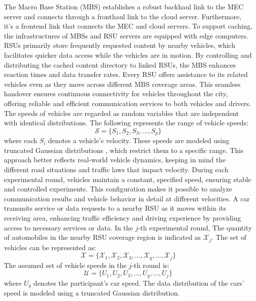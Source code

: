 \documentclass[journal]{IEEEtran}
\begin{document}
The Macro Base Station (MBS) establishes a robust backhaul link to the MEC server and connects through a fronthaul link to the cloud server. Furthermore, it's a frontend link that connects the MEC and cloud servers. To support caching, the infrastructures of MBSs and RSU servers are equipped with edge computers. RSUs primarily store frequently requested content by nearby vehicles, which facilitates quicker data access while the vehicles are in motion. By controlling and distributing the cached content directory to linked RSUs, the MBS enhances reaction times and data transfer rates. Every RSU offers assistance to its related vehicles even as they move across different MBS coverage areas. This seamless handover ensures continuous connectivity for vehicles throughout the city, offering reliable and efficient communication services to both vehicles and drivers. The speeds of vehicles are regarded as random variables that are independent with identical distributions. The following represents the range of vehicle speeds:
\begin{equation}
\mathcal{S} = \{ S_1, S_2, S_3, \ldots, S_p \}
\end{equation}
where each \( S_i \) denotes a vehicle's velocity. These speeds are modeled using truncated Gaussian distributions \cite{r30a}, which restrict them to a specific range. This approach better reflects real-world vehicle dynamics, keeping in mind the different road situations and traffic laws that impact velocity.
During each experimental round, vehicles maintain a constant, specified speed, ensuring stable and controlled experiments. This configuration makes it possible to analyze communication results and vehicle behavior in detail at different velocities. A car transmits service or data requests to a nearby RSU as it moves within its receiving area, enhancing traffic efficiency and driving experience by providing access to necessary services or data. In the \( j \)-th experimental round, The quantity of automobiles in the nearby RSU coverage region is indicated as \( \mathcal{X}_j \). The set of vehicles can be represented as:
\begin{equation}
\mathcal{X} = \{ \mathcal{X}_1, \mathcal{X}_2, \mathcal{X}_3, \ldots, \mathcal{X}_q, \ldots, \mathcal{X}_j \}
\end{equation}
The assumed set of vehicle speeds in the \( j \)-th round is:
\begin{equation}
\mathcal{U} = \{ U_1, U_2, U_3, \ldots, U_q, \ldots, U_j \}
\end{equation}
where \( U_q \) denotes the participant's car speed. The data distribution of the cars' speed is modeled using a truncated Gaussian distribution.
\end{document}
